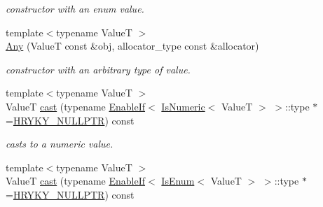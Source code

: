 \begin{DoxyCompactItemize}
\begin{DoxyCompactList}\small\item\em constructor with an enum value. \end{DoxyCompactList}\item 
\hypertarget{classhryky_1_1_any_a1634e976c18ada5c81aec15178cc9c4f}{{\footnotesize template$<$typename Value\-T $>$ }\\\hyperlink{classhryky_1_1_any_a1634e976c18ada5c81aec15178cc9c4f}{Any} (Value\-T const \&obj, allocator\-\_\-type const \&allocator)}\label{classhryky_1_1_any_a1634e976c18ada5c81aec15178cc9c4f}

\begin{DoxyCompactList}\small\item\em constructor with an arbitrary type of value. \end{DoxyCompactList}\item 
\hypertarget{classhryky_1_1_any_ac0e23acd8cc393f4f9c4188229cb9c9e}{{\footnotesize template$<$typename Value\-T $>$ }\\Value\-T \hyperlink{classhryky_1_1_any_ac0e23acd8cc393f4f9c4188229cb9c9e}{cast} (typename \hyperlink{classhryky_1_1_enable_if}{Enable\-If}$<$ \hyperlink{classhryky_1_1_is_numeric}{Is\-Numeric}$<$ Value\-T $>$ $>$\-::type $\ast$=\hyperlink{common_8h_a4cd4ac09cfcdbd6b30ee69afc156e210}{H\-R\-Y\-K\-Y\-\_\-\-N\-U\-L\-L\-P\-T\-R}) const }\label{classhryky_1_1_any_ac0e23acd8cc393f4f9c4188229cb9c9e}

\begin{DoxyCompactList}\small\item\em casts to a numeric value. \end{DoxyCompactList}\item 
\hypertarget{classhryky_1_1_any_a37e3de98575a1b8c72a0fb7f5df978b7}{{\footnotesize template$<$typename Value\-T $>$ }\\Value\-T \hyperlink{classhryky_1_1_any_a37e3de98575a1b8c72a0fb7f5df978b7}{cast} (typename \hyperlink{classhryky_1_1_enable_if}{Enable\-If}$<$ \hyperlink{classhryky_1_1_is_enum}{Is\-Enum}$<$ Value\-T $>$ $>$\-::type $\ast$=\hyperlink{common_8h_a4cd4ac09cfcdbd6b30ee69afc156e210}{H\-R\-Y\-K\-Y\-\_\-\-N\-U\-L\-L\-P\-T\-R}) const }\label{classhryky_1_1_any_a37e3de98575a1b8c72a0fb7f5df978b7}


\end{DoxyCompactItemize}
